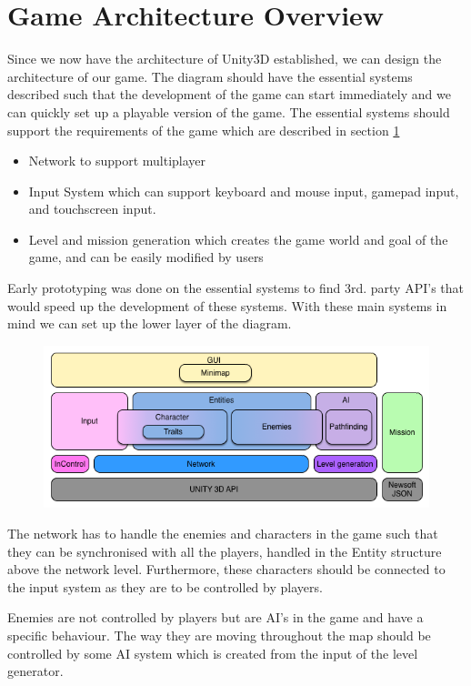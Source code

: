 \section{Game Architecture Overview}
Since we now have the architecture of Unity3D established, we can design the architecture of our game.
The diagram should have the essential systems described such that the development of the game can start immediately and we can quickly set up a playable version of the game.
The essential systems should support the requirements of the game which are described in section \ref{} 
\begin{itemize}
	\item Network to support multiplayer
	\item Input System which can support keyboard and mouse input, gamepad input, and touchscreen input.
	\item Level and mission generation which creates the game world and goal of the game, and can be easily modified by users
\end{itemize}
Early prototyping was done on the essential systems to find 3rd. party API's that would speed up the development of these systems.
With these main systems in mind we can set up the lower layer of the diagram.

\begin{figure}
\includegraphics[width = \textwidth]{figures/architecture/game_architecture_overview.png}
\end{figure}

The network has to handle the enemies and characters in the game such that they can be synchronised with all the players, handled in the Entity structure above the network level. 
Furthermore, these characters should be connected to the input system as they are to be controlled by players.

Enemies are not controlled by players but are AI's in the game and have a specific behaviour.
The way they are moving throughout the map should be controlled by some AI system which is created from the input of the level generator.
